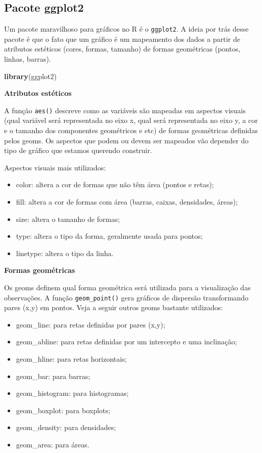 \documentclass[
]{book}
\newenvironment{Shaded}{\begin{snugshade}}{\end{snugshade}}
\newcommand{\KeywordTok}[1]{\textcolor[rgb]{0.13,0.29,0.53}{\textbf{#1}}}
\newcommand{\NormalTok}[1]{#1}
\begin{document}
\hypertarget{pacote-ggplot2}{%
\subsection{Pacote ggplot2}\label{pacote-ggplot2}}

Um pacote maravilhoso para gráficos no R é o \texttt{ggplot2}. A ideia por trás desse pacote é que o fato que um gráfico é um mapeamento dos dados a partir de atributos estéticos (cores, formas, tamanho) de formas geométricas (pontos, linhas, barras).

\begin{Shaded}
\begin{Highlighting}[]
\KeywordTok{library}\NormalTok{(ggplot2)}
\end{Highlighting}
\end{Shaded}

\textbf{Atributos estéticos}

A função \texttt{aes()} descreve como as variáveis são mapeadas em aspectos visuais (qual variável será representada no eixo x, qual será representada no eixo y, a cor e o tamanho dos componentes geométricos e etc) de formas geométricas definidas pelos geoms. Os aspectos que podem ou devem ser mapeados vão depender do tipo de gráfico que estamos querendo construir.

Aspectos visuais mais utilizados:

\begin{itemize}
\item
  color: altera a cor de formas que não têm área (pontos e retas);
\item
  fill: altera a cor de formas com área (barras, caixas, densidades, áreas);
\item
  size: altera o tamanho de formas;
\item
  type: altera o tipo da forma, geralmente usada para pontos;
\item
  linetype: altera o tipo da linha.
\end{itemize}

\textbf{Formas geométricas}

Os geoms definem qual forma geométrica será utilizada para a visualização das observações. A função \texttt{geom\_point()} gera gráficos de dispersão transformando pares (x,y) em pontos. Veja a seguir outros geoms bastante utilizados:

\begin{itemize}
\item
  geom\_line: para retas definidas por pares (x,y);
\item
  geom\_abline: para retas definidas por um intercepto e uma inclinação;
\item
  geom\_hline: para retas horizontais;
\item
  geom\_bar: para barras;
\item
  geom\_histogram: para histogramas;
\item
  geom\_boxplot: para boxplots;
\item
  geom\_density: para densidades;
\item
  geom\_area: para áreas.
\end{itemize}
\end{document}
